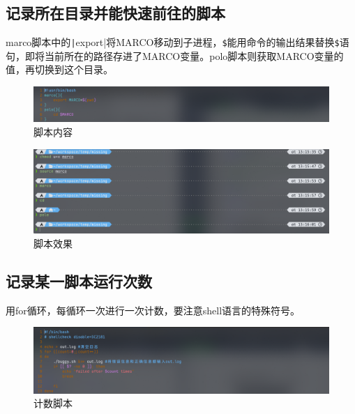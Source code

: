 \documentclass[fontset=ubuntu]{ctexart}
\begin{document}
\begin{sloppypar}
\subsection{记录所在目录并能快速前往的脚本}
marco脚本中的\texttt|export|将MARCO移动到子进程，\verb|$|能用命令的输出结果替换\verb|$|语句，即将当前所在的路径存进了MARCO变量。polo脚本则获取MARCO变量的值，再切换到这个目录。
\begin{figure}[htb]
    \centering
    \includegraphics[width=0.75\linewidth]{Marco.png}
    \caption{脚本内容}
    \label{fig:Marco}
\end{figure}
\begin{figure}[htb]
    \centering
    \includegraphics[width=0.75\linewidth]{Polo.png}
    \caption{脚本效果}
    \label{fig:Polo}
\end{figure}

\subsection{记录某一脚本运行次数}
用for循环，每循环一次进行一次计数，要注意shell语言的特殊符号。
\begin{figure}[htb]
    \centering
    \includegraphics[width=0.75\linewidth]{Debug.png}
    \caption{计数脚本}
    \label{fig:Debug}
\end{figure}


\end{sloppypar}
\end{document}
